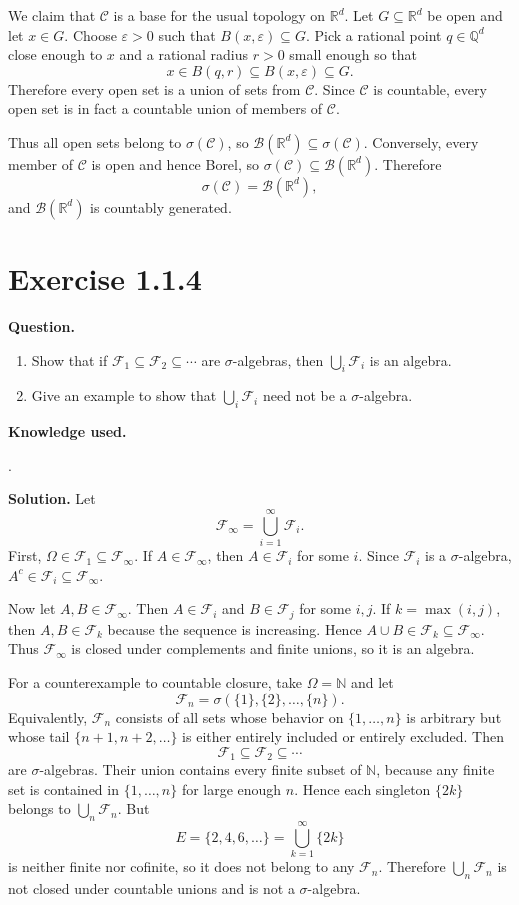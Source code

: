 \documentclass[11pt]{article}
\newcommand{\R}{\mathbb{R}}
\newcommand{\N}{\mathbb{N}}
\newcommand{\B}{\mathcal{B}}
\newcommand{\F}{\mathcal{F}}
\newcommand{\C}{\mathcal{C}}
\newcommand{\Knowledge}[1]{%
  \par\smallskip\noindent
  \textbf{Knowledge used.}
  {\small\color{blue!60!black}\raggedright #1\par}
  \par\smallskip
}
\begin{document}
We claim that $\C$ is a base for the usual topology on $\R^d$.  Let
$G\subseteq\R^d$ be open and let $x\in G$.  Choose $\varepsilon>0$ such
that $B(x,\varepsilon)\subseteq G$.  Pick a rational point
$q\in\mathbb{Q}^d$ close enough to $x$ and a rational radius $r>0$ small
enough so that
\[
  x\in B(q,r)\subseteq B(x,\varepsilon)\subseteq G.
\]
Therefore every open set is a union of sets from $\C$.  Since $\C$ is
countable, every open set is in fact a countable union of members of
$\C$.

Thus all open sets belong to $\sigma(\C)$, so
$\B(\R^d)\subseteq\sigma(\C)$.  Conversely, every member of $\C$ is open
and hence Borel, so $\sigma(\C)\subseteq\B(\R^d)$.  Therefore
\[
  \sigma(\C)=\B(\R^d),
\]
and $\B(\R^d)$ is countably generated.

\section*{Exercise 1.1.4}

\noindent\textbf{Question.}
\begin{enumerate}[label=(\roman*)]
\item Show that if $\F_1\subseteq\F_2\subseteq\cdots$ are
$\sigma$-algebras, then $\bigcup_i\F_i$ is an algebra.
\item Give an example to show that $\bigcup_i\F_i$ need not be a
$\sigma$-algebra.
\end{enumerate}

\Knowledge{
.
}

\noindent\textbf{Solution.}
Let
\[
  \F_\infty=\bigcup_{i=1}^\infty \F_i.
\]
First, $\Omega\in\F_1\subseteq\F_\infty$.  If $A\in\F_\infty$, then
$A\in\F_i$ for some $i$.  Since $\F_i$ is a $\sigma$-algebra,
$A^c\in\F_i\subseteq\F_\infty$.

Now let $A,B\in\F_\infty$.  Then $A\in\F_i$ and $B\in\F_j$ for some
$i,j$.  If $k=\max(i,j)$, then $A,B\in\F_k$ because the sequence is
increasing.  Hence $A\cup B\in\F_k\subseteq\F_\infty$.  Thus
$\F_\infty$ is closed under complements and finite unions, so it is an
algebra.

For a counterexample to countable closure, take $\Omega=\N$ and let
\[
  \F_n=\sigma(\{1\},\{2\},\ldots,\{n\}).
\]
Equivalently, $\F_n$ consists of all sets whose behavior on
$\{1,\ldots,n\}$ is arbitrary but whose tail $\{n+1,n+2,\ldots\}$ is
either entirely included or entirely excluded.  Then
\[
  \F_1\subseteq\F_2\subseteq\cdots
\]
are $\sigma$-algebras.  Their union contains every finite subset of
$\N$, because any finite set is contained in $\{1,\ldots,n\}$ for large
enough $n$.  Hence each singleton $\{2k\}$ belongs to
$\bigcup_n\F_n$.  But
\[
  E=\{2,4,6,\ldots\}
  =\bigcup_{k=1}^\infty \{2k\}
\]
is neither finite nor cofinite, so it does not belong to any $\F_n$.
Therefore $\bigcup_n\F_n$ is not closed under countable unions and is not
a $\sigma$-algebra.
\end{document}
